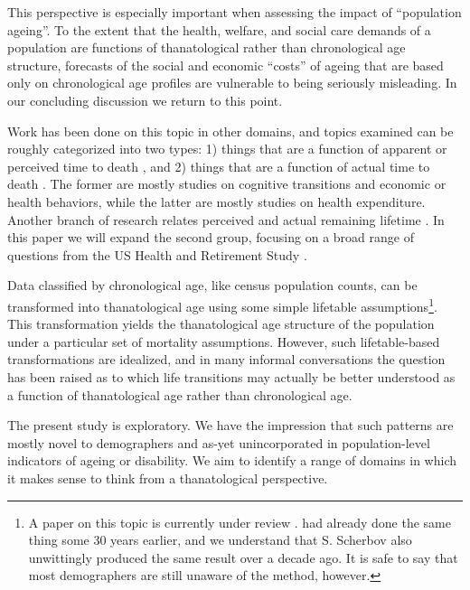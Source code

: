 \documentclass{article}
\begin{document}
This perspective is especially important when assessing the impact of
``population ageing''.
To the extent that the health, welfare, and social care demands of a
population are functions of thanatological rather than chronological age
structure, forecasts of the social and economic ``costs'' of ageing that are
based only on chronological age profiles are vulnerable to being seriously
misleading.
In our concluding discussion we return to this point.

Work has been done on this topic in other domains, and
topics examined can be roughly categorized into two types: 1) things that are a
function of apparent or perceived time to death
\citep{hamermesh1985expectations,hurd1995evaluation,carstensen2006influence,gan2004subjective,biro2010subjective,salm2010subjective,van2010living,cocco2012longevity,payne2013life,balia2013survival},
and 2) things that are a function of actual time to death
\citep{miller2001increasing,seshamani2004longitudinal,werblow2007population}.
The former are mostly studies on cognitive transitions and economic or
health behaviors, while the latter are mostly studies on health expenditure.
Another branch of research relates perceived and actual remaining lifetime
\citep{perozek2008using,delavande2011differential,post2012longevity,kutlu2013individuals}.
In this paper we will expand the second group, focusing on a broad range of
questions from the US Health and Retirement Study \citep{HRS}.

Data classified by chronological age, like census population counts, can be
transformed into thanatological age using some simple lifetable
assumptions\footnote{A paper on this topic is currently under review \citep{riffe2014paaposter}. \citet{brouard1986structure,
brouard1989mouvements} had already done the same thing some 30 years earlier, and we understand that
S. Scherbov also unwittingly produced the same result over a decade ago. It is
safe to say that most demographers are still unaware of the method, however.}.
This transformation yields the thanatological age structure of the population
under a particular set of mortality assumptions.
However, such lifetable-based transformations are idealized, and in many informal
conversations the question has been raised as to which life transitions
may actually be better understood as a function of thanatological
age rather than chronological age.

The present study is exploratory. We have the impression
that such patterns are mostly novel to demographers and as-yet unincorporated in
population-level indicators of ageing or disability. We aim to identify a
range of domains in which it makes sense to think from a
thanatological perspective. 
\end{document}
